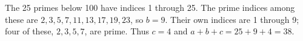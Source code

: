 The 25 primes below 100 have indices 1 through 25. The prime indices among these are $2,3,5,7,11,13,17,19,23$, so $b=9$. Their own indices are 1 through 9; four of these, $2,3,5,7$, are prime. Thus $c=4$ and $a+b+c=25+9+4=\boxed{38}$.
